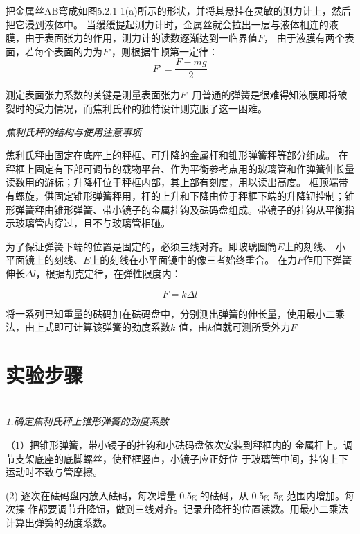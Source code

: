 \documentclass[UTF8]{ctexart}
\begin{document}
把金属丝AB弯成如图5.2.1-1(a)\cite{dawushiyan}所示的形状，并将其悬挂在灵敏的测力计上，然后把它浸到液体中。
当缓缓提起测力计时，金属丝就会拉出一层与液体相连的液膜，由于表面张力的作用，测力计的读数逐渐达到一临界值$F$，
由于液膜有两个表面，若每个表面的力为$F’$，则根据牛顿第一定律：
\begin{equation}
    F'=\frac{F-mg}{2}
\end{equation}

测定表面张力系数的关键是测量表面张力$F’$
用普通的弹簧是很难得知液膜即将破裂时的受力情况，而焦利氏秤的独特设计则克服了这一困难。\\[0.4cm]

\begin{center}
    \emph{焦利氏秤的结构与使用注意事项} \\[0.4cm]
\end{center}

焦利氏秤由固定在底座上的秤框、可升降的金属杆和锥形弹簧秤等部分组成。
在秤框上固定有下部可调节的载物平台、作为平衡参考点用的玻璃管和作弹簧伸长量读数用的游标；升降杆位于秤框内部，其上部有刻度，用以读出高度。
框顶端带有螺旋，供固定锥形弹簧秤用，杆的上升和下降由位于秤框下端的升降钮控制；锥形弹簧秤由锥形弹簧、带小镜子的金属挂钩及砝码盘组成。带镜子的挂钩从平衡指示玻璃管内穿过，且不与玻璃管相碰。

为了保证弹簧下端的位置是固定的，必须三线对齐。即玻璃圆筒$E$上的刻线、
小平面镜上的刻线、$E$上的刻线在小平面镜中的像三者始终重合。
在力$F$作用下弹簧伸长$\varDelta l$，根据胡克定律，在弹性限度内：

\begin{equation}
    F = k \varDelta l
\end{equation}

将一系列已知重量的砝码加在砝码盘中，分别测出弹簧的伸长量，使用最小二乘法，由上式即可计算该弹簧的劲度系数$k$
值，由$k$值就可测所受外力$F$

    \section{实验步骤}

    \emph{\\[0.02cm]1.确定焦利氏秤上锥形弹簧的劲度系数}

    （1）把锥形弹簧，带小镜子的挂钩和小砝码盘依次安装到秤框内的
    金属杆上。调节支架底座的底脚螺丝，使秤框竖直，小镜子应正好位
    于玻璃管中间，挂钩上下运动时不致与管摩擦。

    (2) 逐次在砝码盘内放入砝码，每次增量 0.5g 的砝码，从 0.5g~5g 范围内增加。每次操
    作都要调节升降钮，做到三线对齐。记录升降杆的位置读数。用最小二乘法计算出弹簧的劲度系数。
\end{document}
